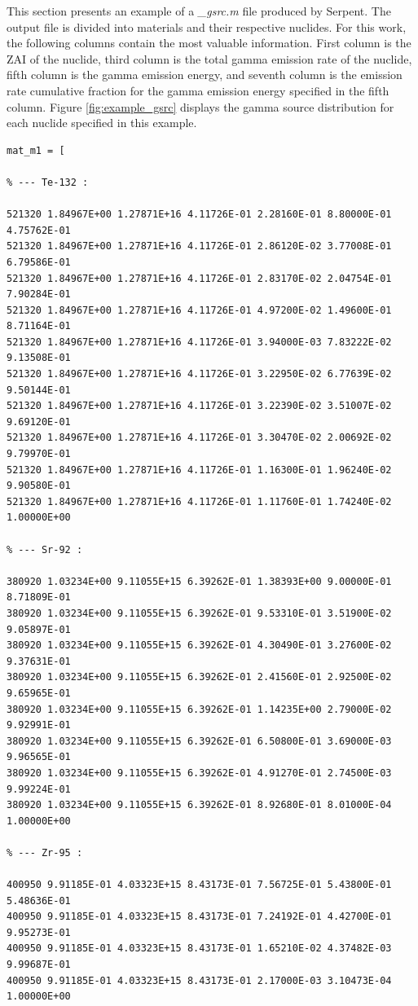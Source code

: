 \label{ap:serpent_gsrc}

This section presents an example of a \textit{\_gsrc.m} file produced by Serpent.
The output file is divided into materials and their respective nuclides.
For this work, the following columns contain the most valuable information.
First column is the ZAI of the nuclide, third column is the total gamma emission rate of the nuclide, fifth column is the gamma emission energy, and seventh column is the emission rate cumulative fraction for the gamma emission energy specified in the fifth column.
Figure \ref{fig:example_gsrc} displays the gamma source distribution for each nuclide specified in this example.

\begin{lstlisting}
mat_m1 = [

% --- Te-132 :

521320 1.84967E+00 1.27871E+16 4.11726E-01 2.28160E-01 8.80000E-01 4.75762E-01
521320 1.84967E+00 1.27871E+16 4.11726E-01 2.86120E-02 3.77008E-01 6.79586E-01
521320 1.84967E+00 1.27871E+16 4.11726E-01 2.83170E-02 2.04754E-01 7.90284E-01
521320 1.84967E+00 1.27871E+16 4.11726E-01 4.97200E-02 1.49600E-01 8.71164E-01
521320 1.84967E+00 1.27871E+16 4.11726E-01 3.94000E-03 7.83222E-02 9.13508E-01
521320 1.84967E+00 1.27871E+16 4.11726E-01 3.22950E-02 6.77639E-02 9.50144E-01
521320 1.84967E+00 1.27871E+16 4.11726E-01 3.22390E-02 3.51007E-02 9.69120E-01
521320 1.84967E+00 1.27871E+16 4.11726E-01 3.30470E-02 2.00692E-02 9.79970E-01
521320 1.84967E+00 1.27871E+16 4.11726E-01 1.16300E-01 1.96240E-02 9.90580E-01
521320 1.84967E+00 1.27871E+16 4.11726E-01 1.11760E-01 1.74240E-02 1.00000E+00

% --- Sr-92 :

380920 1.03234E+00 9.11055E+15 6.39262E-01 1.38393E+00 9.00000E-01 8.71809E-01
380920 1.03234E+00 9.11055E+15 6.39262E-01 9.53310E-01 3.51900E-02 9.05897E-01
380920 1.03234E+00 9.11055E+15 6.39262E-01 4.30490E-01 3.27600E-02 9.37631E-01
380920 1.03234E+00 9.11055E+15 6.39262E-01 2.41560E-01 2.92500E-02 9.65965E-01
380920 1.03234E+00 9.11055E+15 6.39262E-01 1.14235E+00 2.79000E-02 9.92991E-01
380920 1.03234E+00 9.11055E+15 6.39262E-01 6.50800E-01 3.69000E-03 9.96565E-01
380920 1.03234E+00 9.11055E+15 6.39262E-01 4.91270E-01 2.74500E-03 9.99224E-01
380920 1.03234E+00 9.11055E+15 6.39262E-01 8.92680E-01 8.01000E-04 1.00000E+00

% --- Zr-95 :

400950 9.91185E-01 4.03323E+15 8.43173E-01 7.56725E-01 5.43800E-01 5.48636E-01
400950 9.91185E-01 4.03323E+15 8.43173E-01 7.24192E-01 4.42700E-01 9.95273E-01
400950 9.91185E-01 4.03323E+15 8.43173E-01 1.65210E-02 4.37482E-03 9.99687E-01
400950 9.91185E-01 4.03323E+15 8.43173E-01 2.17000E-03 3.10473E-04 1.00000E+00


\end{lstlisting}
